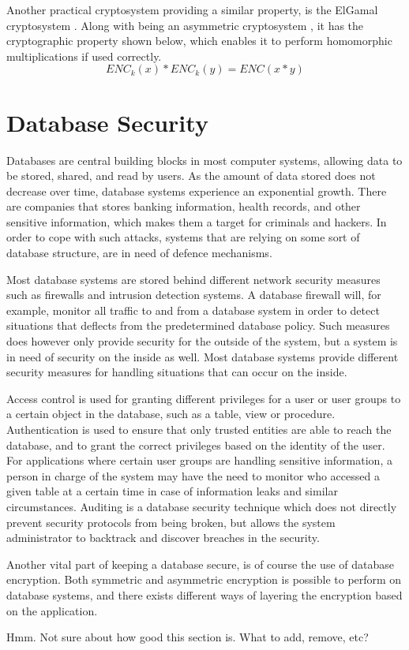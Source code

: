 Another practical cryptosystem providing a similar property, is the ElGamal cryptosystem \cite{elgamal}. Along with being an asymmetric cryptosystem , it has the cryptographic property shown below, which enables it to perform homomorphic multiplications if used correctly.  \[ENC_k(x) * ENC_k(y) = ENC(x * y)\]


\section{Database Security}
\label{chp:database_Security}

Databases are central building blocks in most computer systems, allowing data to be stored, shared, and read by users. As the amount of data stored does not decrease over time, database systems experience an exponential growth. There are companies that stores banking information, health records, and other sensitive information, which makes them a target for criminals and hackers. In order to cope with such attacks, systems that are relying on some sort of database structure, are in need of defence mechanisms. 


Most database systems are stored behind different network security measures such as firewalls and intrusion detection systems. A database firewall will, for example, monitor all traffic to and from a database system in order to detect situations that deflects from the predetermined database policy. Such measures does however only provide security for the outside of the system, but a system is in need of security on the inside as well. Most database systems provide different security measures for handling situations that can occur on the inside.

Access control is used for granting different privileges for a user or user groups to a certain object in the database, such as a table, view or procedure. Authentication is used to ensure that only trusted entities are able to reach the database, and to grant the correct privileges based on the identity of the user. For applications where certain user groups are handling sensitive information, a person in charge of the system may have the need to monitor who accessed a given table at a certain time in case of information leaks and similar circumstances. Auditing is a database security technique which does not directly prevent security protocols from being broken, but allows the system administrator to backtrack and discover breaches in the security.

Another vital part of keeping a database secure, is of course the use of database encryption. Both symmetric and asymmetric encryption is possible to perform on database systems, and there exists different ways of layering the encryption based on the application.


Hmm. Not sure about how good this section is. What to add, remove, etc?
